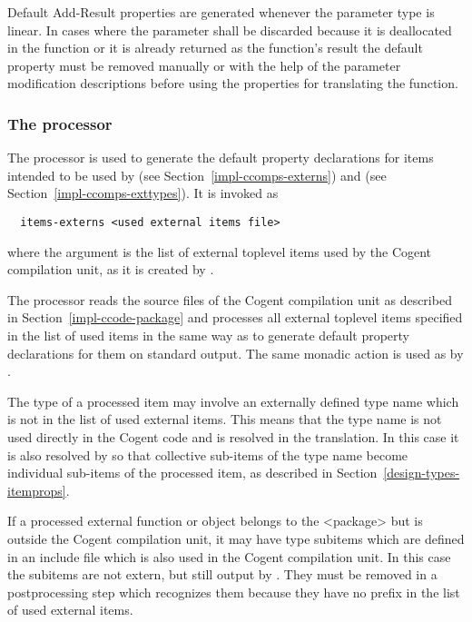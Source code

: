 Default Add-Result properties are generated whenever the parameter type is linear. In cases where the parameter 
shall be discarded because it is deallocated in the function or it is already returned as the function's result
the default property must be removed manually or with the help of the parameter modification descriptions before
using the properties for translating the function.

\subsubsection{The processor }

The processor  is used to generate the default property declarations for items intended
to be used by  (see Section~\ref{impl-ccomps-externs}) and  
(see Section~\ref{impl-ccomps-exttypes}). It is invoked as
\begin{verbatim}
  items-externs <used external items file>
\end{verbatim}
where the argument is the list of external toplevel items used by the Cogent compilation unit, as it is created 
by .

The processor reads the source files of the Cogent compilation unit as described in Section~\ref{impl-ccode-package}
and processes all external toplevel items specified in the list of used items in the same way as 
to generate default property declarations for them on standard output. The same monadic action 
is used as by .

The type of a processed item may involve an externally defined type name which is not in the list of used external items.
This means that the type name is not used directly in the Cogent code and is resolved in the translation. In this case it is 
also resolved by  so that collective sub-items of the type name become individual sub-items of 
the processed item, as described in Section~\ref{design-types-itemprops}.

If a processed external function or object belongs to the <package> but is outside the Cogent compilation unit, it may
have type subitems which are defined in an include file which is also used in the Cogent compilation unit. In this
case the subitems are not extern, but still output by . They must be removed in a postprocessing
step which recognizes them because they have no prefix in the list of used external items.

